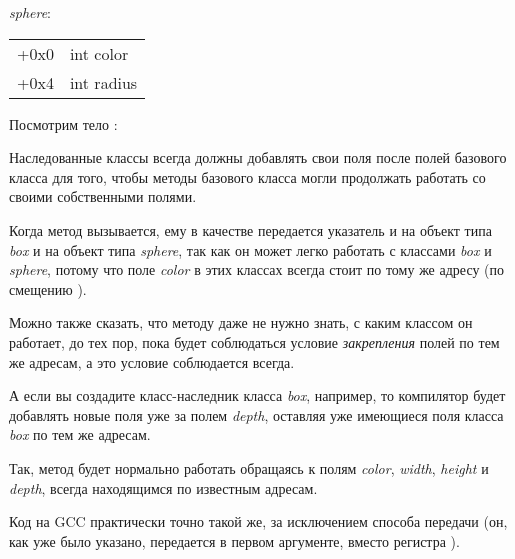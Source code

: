 \emph{sphere}:

\begin{center}
\begin{tabular}{ | l | l | }
\hline
  \tableheader{} \\
\hline
  +0x0 & int color \\
\hline
  +0x4 & int radius \\
\hline
\end{tabular}
\end{center}

Посмотрим тело \main:



Наследованные классы всегда должны добавлять свои поля после полей базового класса для того, чтобы методы
базового класса могли продолжать работать со своими собственными полями.


Когда метод  вызывается, ему в качестве  передается указатель и на объект типа \emph{box} 
и на объект типа \emph{sphere}, так как он может легко работать с классами \emph{box} и \emph{sphere}, потому что поле \emph{color} в этих
классах всегда стоит по тому же адресу (по смещению ).


Можно также сказать, что методу  даже не нужно знать,
с каким классом он работает, до тех пор, пока будет соблюдаться условие \emph{закрепления} полей по тем же адресам,
а это условие соблюдается всегда.


А если вы создадите класс-наследник класса \emph{box}, например, 
то компилятор будет добавлять новые поля уже за полем \emph{depth}, оставляя уже имеющиеся поля класса \emph{box} по тем же адресам.


Так, метод  будет нормально работать обращаясь к полям 
\emph{color}, \emph{width}, \emph{height} и \emph{depth}, всегда находящимся по известным адресам.


Код на GCC практически точно такой же, за исключением способа передачи  (он, как уже было указано, 
передается в первом аргументе, вместо регистра \ECX).


